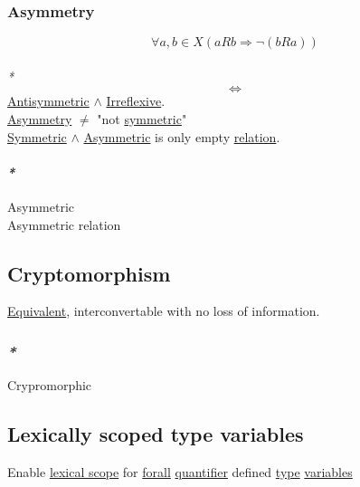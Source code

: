 \documentclass[11pt]{article}
\begin{document}
\subsubsection{\label{org3de2923}Asymmetry}
\label{sec:org1d82def}

$$ \forall a,b \in X (aRb \Rightarrow \neg (bRa)) $$\\
\emph{*} $$ \iff $$ \hyperref[org125842e]{Antisymmetric} \(\land\) \hyperref[orge4e7a0b]{Irreflexive}.\\
\hyperref[org3de2923]{Asymmetry} \(\ne\) "not \hyperref[org63aee59]{symmetric}"\\
\hyperref[org63aee59]{Symmetric} \(\land\) \hyperref[org7a45bd9]{Asymmetric} is only empty \hyperref[orga5705a9]{relation}.\\

\paragraph{\emph{*}}
\label{sec:org9b17407}

\label{org7a45bd9}Asymmetric\\
\label{org81cc274}Asymmetric relation\\

\subsection{\label{orgc29808f}Cryptomorphism}
\label{sec:org4218cb7}

\hyperref[orgff529d7]{Equivalent}, interconvertable with no loss of information.\\

\subsubsection{\emph{*}}
\label{sec:orgccfc235}

\label{orgac13424}Crypromorphic\\

\subsection{\label{org19688d5}Lexically scoped type variables}
\label{sec:orgc042c55}

Enable \hyperref[org6a58f4c]{lexical scope} for \hyperref[orga0ddc78]{forall} \hyperref[org357bc41]{quantifier} defined \hyperref[orgc4aea2f]{type} \hyperref[orge17f54f]{variables}\\
\end{document}
